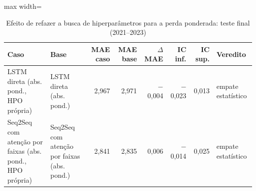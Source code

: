 \begin{table}[!htbp]
    \centering
    \caption{Efeito de refazer a busca de hiperparâmetros para a perda ponderada: teste final (2021--2023)}
    \label{tab:verificacao_hpo_holdout}
    \small
    \begin{adjustbox}{max width=\textwidth}
    \begin{tabular}{>{\raggedright\arraybackslash}p{}lrrrrrl}
        \toprule
        Caso & Base & MAE caso & MAE base & $\Delta$ MAE & IC inf. & IC sup. & Veredito \\
        \midrule
        LSTM direta (abs. pond., HPO própria) & LSTM direta (abs. pond.) & 2,967 & 2,971 & $-$0,004 & $-$0,023 & 0,013 & empate estatístico \\
        Seq2Seq com atenção por faixas (abs. pond., HPO própria) & Seq2Seq com atenção por faixas (abs. pond.) & 2,841 & 2,835 & 0,006 & $-$0,014 & 0,025 & empate estatístico \\
        \bottomrule
    \end{tabular}
    \end{adjustbox}
\end{table}
